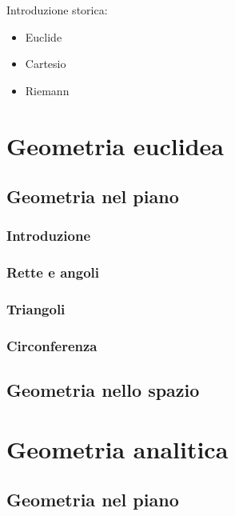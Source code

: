 
Introduzione storica:
\begin{itemize}
  \item Euclide
  \item Cartesio
  \item Riemann
\end{itemize}

\chapter{Geometria euclidea}\label{ch:geometry-euclidean}
\section{Geometria nel piano}
\subsection{Introduzione}
\subsection{Rette e angoli}
\subsection{Triangoli}
\subsection{Circonferenza}

\section{Geometria nello spazio}

\chapter{Geometria analitica}\label{ch:geometry-analytical}
\section{Geometria nel piano}

